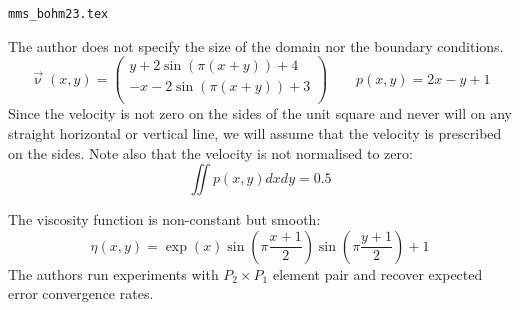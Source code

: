 \begin{flushright} {\tiny {\color{gray} \tt mms\_bohm23.tex}} \end{flushright}

The author does not specify the size of the domain nor the boundary conditions. 
\[
\vec\upnu(x,y) =
\left(
\begin{array}{c}
y+2\sin (\pi(x+y))+4 \\
-x-2\sin(\pi(x+y))+3 \\
\end{array}
\right)
\qquad
p(x,y)=2x-y+1
\]
Since the velocity is not zero on the sides of the unit square and never will on 
any straight horizontal or vertical line, we will assume that the 
velocity is prescribed on the sides.
Note also that the velocity is not normalised to zero:
\[
\iint p(x,y) dx dy = 0.5
\]
 
The viscosity function is non-constant but smooth:
\[
\eta(x,y)=\exp(x) \sin \left(\pi \frac{x+1}{2} \right) \sin \left(\pi \frac{y+1}{2}\right)  +1
\]
The authors run experiments with $P_2\times P_1$ element pair and recover expected 
error convergence rates.
